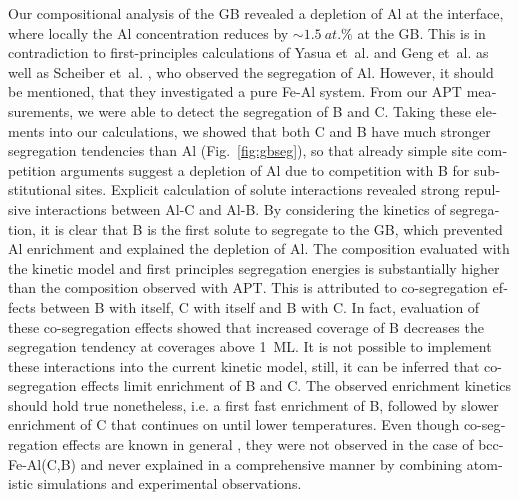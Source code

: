 \documentclass[12pt,a4paper,twoside,twocolumn,english,english]{article}
\begin{document}
\begin{otherlanguage}{english}
Our compositional analysis of the GB revealed a depletion of Al at the interface, where locally the Al concentration reduces by $\sim 1.5~at.\%$ at the GB. This is in contradiction to first-principles calculations of Yasua et~al. \cite{yuasa_first-principles_2013} and Geng et~al. \cite{geng_influence_2001} as well as Scheiber et~al. \cite{scheiber2020solute}, who observed the segregation of Al. However, it should be mentioned, that they investigated a pure Fe-Al system. From our APT measurements, we were able to detect the segregation of B and C. Taking these elements into our calculations, we showed that both C and B have much stronger segregation tendencies than Al (Fig.~\ref{fig:gbseg}), so that already simple site competition arguments suggest a depletion of Al due to competition with B for substitutional sites. Explicit calculation of solute interactions revealed strong repulsive interactions between Al-C and Al-B. By considering the kinetics of segregation, it is clear that B is the first solute to segregate to the GB, which prevented Al enrichment and explained the depletion of Al. The composition evaluated with the kinetic model and first principles segregation energies is substantially higher than the composition observed with APT. This is attributed to co-segregation effects between B with itself, C with itself and B with C. In fact, evaluation of these co-segregation effects showed that increased coverage of B decreases the segregation tendency at coverages above 1~ML. It is not possible to implement these interactions into the current kinetic model, still, it can be inferred that co-segregation effects limit enrichment of B and C. The observed enrichment kinetics should hold true nonetheless, i.e. a first fast enrichment of B, followed by slower enrichment of C that continues on until lower temperatures. Even though co-segregation effects are known in general \cite{Erhart1981}, they were not observed in the case of bcc-Fe-Al(C,B) and never explained in a comprehensive manner by combining atomistic simulations and experimental observations. 


\end{otherlanguage}
\end{document}
